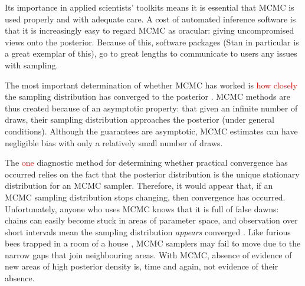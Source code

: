 \documentclass{article}
\begin{document}
Its importance in applied scientists' toolkits means it is essential that MCMC is used properly and with adequate care. A cost of automated inference software is that it is increasingly easy to regard MCMC as oracular: giving uncompromised views onto the posterior. Because of this, software packages (Stan in particular \citep{carpenter2017stan} is a great exemplar of this), go to great lengths to communicate to users any issues with sampling.

The most important determination of whether MCMC has worked is \textcolor{red}{how closely} the sampling distribution has converged to the posterior \citep{brooks2011handbook}. MCMC methods are thus created because of an asymptotic property: that given an infinite number of draws, their sampling distribution approaches the posterior (under general conditions). Although the guarantees are asymptotic, MCMC estimates can have negligible bias with only a relatively small number of draws.

The \textcolor{red}{one} diagnostic method for determining whether practical convergence has occurred relies on the fact that the posterior distribution is the unique stationary distribution for an MCMC sampler. Therefore, it would appear that, if an MCMC sampling distribution stops changing, then convergence has occurred. Unfortunately, anyone who uses MCMC knows that it is full of false dawns: chains can easily become stuck in areas of parameter space, and observation over short intervals mean the sampling distribution \textit{appears} converged \citep{gelman1992single}. Like furious bees trapped in a room of a house \citep{lambertbees}, MCMC samplers may fail to move due to the narrow gaps that join neighbouring areas. With MCMC, absence of evidence of new areas of high posterior density is, time and again, not evidence of their absence.
\end{document}
